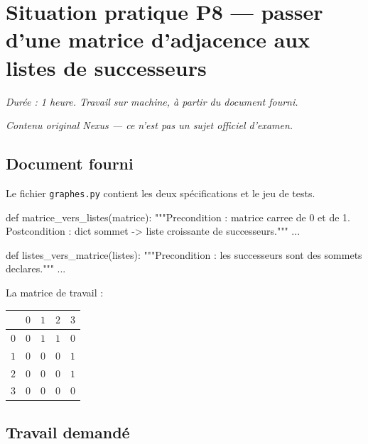 \section*{Situation pratique P8 --- passer d'une matrice d'adjacence aux listes de successeurs}

\textit{Durée : 1 heure. Travail sur machine, à partir du document fourni.}

\medskip
\textit{Contenu original Nexus --- ce n'est pas un sujet officiel d'examen.}

\subsection*{Document fourni}

Le fichier \lstinline{graphes.py} contient les deux spécifications et le jeu de
tests.

\begin{python}
def matrice_vers_listes(matrice):
    """Precondition : matrice carree de 0 et de 1.
    Postcondition : dict sommet -> liste croissante de successeurs."""
    ...

def listes_vers_matrice(listes):
    """Precondition : les successeurs sont des sommets declares."""
    ...
\end{python}

La matrice de travail :

\begin{center}
\begin{tabular}{|c|c|c|c|c|}
\hline
 & $0$ & $1$ & $2$ & $3$ \\
\hline
$0$ & $0$ & $1$ & $1$ & $0$ \\
\hline
$1$ & $0$ & $0$ & $0$ & $1$ \\
\hline
$2$ & $0$ & $0$ & $0$ & $1$ \\
\hline
$3$ & $0$ & $0$ & $0$ & $0$ \\
\hline
\end{tabular}
\end{center}

\subsection*{Travail demandé}

